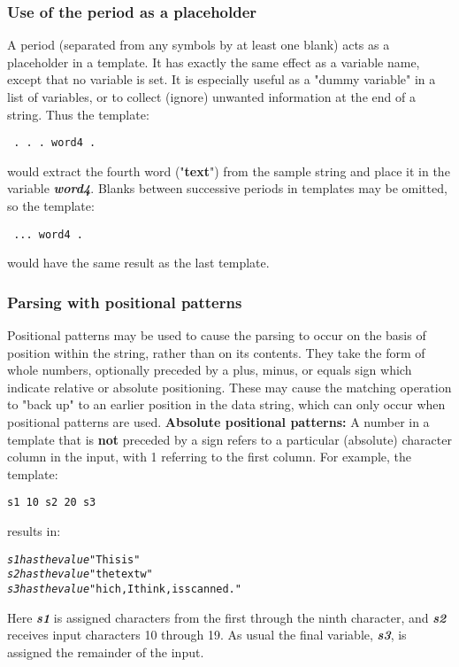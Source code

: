 \subsubsection{Use of the period as a placeholder}\label{refplaceh}
 A period (separated from any symbols by at least one blank) acts as a
placeholder in a template.
It has exactly the same effect as a variable name, except that no
variable is set.
It is especially useful as a "dummy variable" in a list of
variables, or to collect (ignore) unwanted information at the end of a
string.  Thus the template:
\begin{lstlisting}
 . . . word4 .
\end{lstlisting}
would extract the fourth word ("\textbf{text}") from the sample
string and place it in the variable \textbf{\emph{word4}}.
Blanks between successive periods in templates may be omitted, so the
template:
\begin{lstlisting}
 ... word4 .
\end{lstlisting}
would have the same result as the last template.
\subsubsection{Parsing with positional patterns}
 Positional patterns may be used to cause the parsing to occur on the
basis of position within the string, rather than on its contents.
They take the form of whole numbers, optionally preceded by a plus,
minus, or equals sign which indicate relative or absolute positioning.
These may cause the matching operation to "back up" to an earlier
position in the data string, which can only occur when positional
patterns are used.
 \textbf{Absolute positional patterns:}
A number in a template that is \textbf{not} preceded by a sign
refers to a particular (absolute)
character column in the input, with 1 referring to the first
column.
For example, the template:
\begin{lstlisting}
s1 10 s2 20 s3
\end{lstlisting}
results in:
\begin{alltt}
\emph{s1} \emph{has the value} "This is  "
\emph{s2} \emph{has the value} "the text w"
\emph{s3} \emph{has the value} "hich, I think,  is scanned."
\end{alltt}
 Here \textbf{\emph{s1}} is assigned characters from the first
through the ninth character, and \textbf{\emph{s2}} receives input
characters 10 through 19.
As usual the final variable, \textbf{\emph{s3}}, is assigned the
remainder of the input.
 
